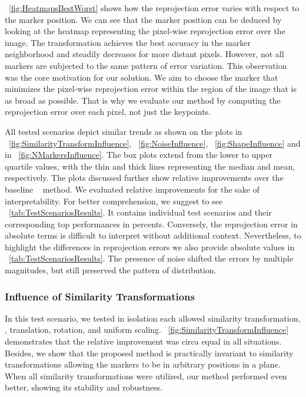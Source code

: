 \figtext{}~\ref{fig:HeatmapsBestWorst} shows how the reprojection error varies with respect to the marker position. We can see that the marker position can be deduced by looking at the heatmap representing the pixel-wise reprojection error over the image. The transformation achieves the best accuracy in the marker neighborhood and steadily decreases for more distant pixels. However, not all markers are subjected to the same pattern of error variation. This observation was the core motivation for our solution. We aim to choose the marker that minimizes the pixel-wise reprojection error within the region of the image that is as broad as possible. That is why we evaluate our method by computing the reprojection error over each pixel, not just the keypoints.

All tested scenarios depict similar trends as shown on the plots in \figtext{}~\ref{fig:SimilarityTransformInfluence}, \figtext{}~\ref{fig:NoiseInfluence}, \figtext{}~\ref{fig:ShapeInfluence} and in \figtext{}~\ref{fig:NMarkersInfluence}. The box plots extend from the lower to upper quartile values, with the thin and thick lines representing the median and mean, respectively. The plots discussed further show relative improvements over the baseline \opencv{}~\cite{bradski2008learning} method. We evaluated relative improvements for the sake of interpretability. For better comprehension, we suggest to see \tabletext{}~\ref{tab:TestScenariosResults}. It contains individual test scenarios and their corresponding top performances in percents. Conversely, the reprojection error in absolute terms is difficult to interpret without additional context. Nevertheless, to highlight the differences in reprojection errors we also provide absolute values in \tabletext{}~\ref{tab:TestScenariosResults}. The presence of noise shifted the errors by multiple magnitudes, but still preserved the pattern of distribution.

\subsubsection{Influence of Similarity Transformations}

In this test scenario, we tested in isolation each allowed similarity transformation, \ietext{}, translation, rotation, and uniform scaling. \figtext{}~\ref{fig:SimilarityTransformInfluence} demonstrates that the relative improvement was circa equal in all situations. Besides, we show that the proposed method is practically invariant to similarity transformations allowing the markers to be in arbitrary positions in a plane. When all similarity transformations were utilized, our method performed even better, showing its stability and robustness.

